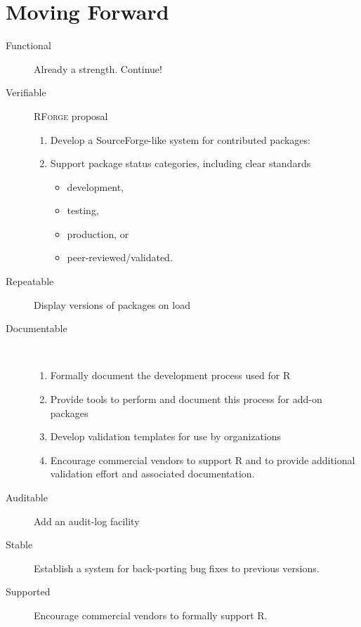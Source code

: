 \documentclass{asaproc}
\begin{document}
\section{Moving Forward}

\begin{description}
  \item[Functional] Already a strength. Continue!
  \item[Verifiable] \textsc{RForge} proposal
    \begin{enumerate}
      \item Develop a SourceForge-like system for contributed packages: 
      \item Support package status categories, including clear standards
        \begin{itemize}
        \item development,
        \item testing,
        \item production, or
        \item peer-reviewed/validated.
        \end{itemize}
      \end{enumerate}
  \item[Repeatable] Display versions of packages on load
  \item[Documentable] ~ 
    \begin{enumerate}
    \item Formally document the development process used for \textsc{R}
    \item Provide tools to perform and document this process for
      add-on packages
    \item Develop validation templates for use by organizations
    \item Encourage commercial vendors to support \textsc{R} and to provide
      additional validation effort and associated documentation.
    \end{enumerate}
  \item[Auditable] Add an audit-log facility
  \item[Stable] Establish a system for back-porting bug fixes to
    previous versions.
  \item[Supported] Encourage commercial vendors to formally support \textsc{R}.
\end{description}
\end{document}
